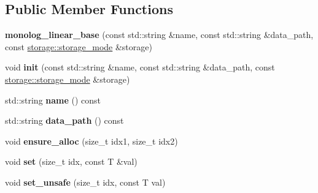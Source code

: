 \subsection*{Public Member Functions}
\begin{DoxyCompactItemize}
\item 
\mbox{\label{classdialog_1_1monolog_1_1monolog__linear__base_ad8c76402bc404f2f39fa5675fdf0f0c3}} 
{\bfseries monolog\+\_\+linear\+\_\+base} (const std\+::string \&name, const std\+::string \&data\+\_\+path, const \hyperlink{structdialog_1_1storage_1_1storage__mode}{storage\+::storage\+\_\+mode} \&storage)
\item 
\mbox{\label{classdialog_1_1monolog_1_1monolog__linear__base_afd25fba29a97be9f4ca88f2b8f6bda81}} 
void {\bfseries init} (const std\+::string \&name, const std\+::string \&data\+\_\+path, const \hyperlink{structdialog_1_1storage_1_1storage__mode}{storage\+::storage\+\_\+mode} \&storage)
\item 
\mbox{\label{classdialog_1_1monolog_1_1monolog__linear__base_ae381905913522b2049e30e8906e58256}} 
std\+::string {\bfseries name} () const
\item 
\mbox{\label{classdialog_1_1monolog_1_1monolog__linear__base_aa2fb2303ceeb3c414253887141a5d5ad}} 
std\+::string {\bfseries data\+\_\+path} () const
\item 
\mbox{\label{classdialog_1_1monolog_1_1monolog__linear__base_ab47c32ca7520b3f2013668aa944155b9}} 
void {\bfseries ensure\+\_\+alloc} (size\+\_\+t idx1, size\+\_\+t idx2)
\item 
\mbox{\label{classdialog_1_1monolog_1_1monolog__linear__base_a61b4205f5c566b48a9bb39193da48695}} 
void {\bfseries set} (size\+\_\+t idx, const T \&val)
\item 
\mbox{\label{classdialog_1_1monolog_1_1monolog__linear__base_a2845c0248840b7af62b5534c037db58c}} 
void {\bfseries set\+\_\+unsafe} (size\+\_\+t idx, const T val)

\end{DoxyCompactItemize}
